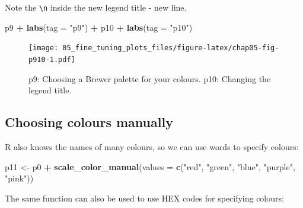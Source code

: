 \documentclass[
  12pt,
  krantz2]{krantz}
\makeatletter
\newenvironment{Shaded}{\begin{snugshade}}{\end{snugshade}}
\newcommand{\DataTypeTok}[1]{\textcolor[rgb]{0.13,0.29,0.53}{#1}}
\newcommand{\KeywordTok}[1]{\textcolor[rgb]{0.13,0.29,0.53}{\textbf{#1}}}
\newcommand{\NormalTok}[1]{#1}
\newcommand{\OperatorTok}[1]{\textcolor[rgb]{0.81,0.36,0.00}{\textbf{#1}}}
\newcommand{\StringTok}[1]{\textcolor[rgb]{0.31,0.60,0.02}{#1}}
\newenvironment{kframe}{%
\medskip{}
\setlength{\fboxsep}{.8em}
 \def\at@end@of@kframe{}%
 \ifinner\ifhmode%
  \def\at@end@of@kframe{\end{minipage}}%
  \begin{minipage}{\columnwidth}%
 \fi\fi%
 \def\FrameCommand##1{\hskip\@totalleftmargin \hskip-\fboxsep
 \colorbox{shadecolor}{##1}\hskip-\fboxsep
     \hskip-\linewidth \hskip-\@totalleftmargin \hskip\columnwidth}%
 \MakeFramed {\advance\hsize-\width
   \@totalleftmargin\z@ \linewidth\hsize
   \@setminipage}}%
 {\par\unskip\endMakeFramed%
 \at@end@of@kframe}
\renewenvironment{Shaded}{\begin{kframe}}{\end{kframe}}
\makeatother
\begin{document}
Note the \texttt{\textbackslash{}n} inside the new legend title - new line.

\begin{Shaded}
\begin{Highlighting}[]
\NormalTok{p9 }\OperatorTok{+}\StringTok{ }\KeywordTok{labs}\NormalTok{(}\DataTypeTok{tag =} \StringTok{"p9"}\NormalTok{) }\OperatorTok{+}\StringTok{ }\NormalTok{p10 }\OperatorTok{+}\StringTok{ }\KeywordTok{labs}\NormalTok{(}\DataTypeTok{tag =} \StringTok{"p10"}\NormalTok{)}
\end{Highlighting}
\end{Shaded}

\begin{figure}
\centering
\texttt{[image: 05\_fine\_tuning\_plots\_files/figure-latex/chap05-fig-p910-1.pdf]}
\caption{\label{fig:chap05-fig-p910}p9: Choosing a Brewer palette for your colours. p10: Changing the legend title.}
\end{figure}

\hypertarget{choosing-colours-manually}{%
\subsection{Choosing colours manually}\label{choosing-colours-manually}}

R also knows the names of many colours, so we can use words to specify colours:

\begin{Shaded}
\begin{Highlighting}[]
\NormalTok{p11 <-}\StringTok{ }\NormalTok{p0 }\OperatorTok{+}
\StringTok{  }\KeywordTok{scale_color_manual}\NormalTok{(}\DataTypeTok{values =} \KeywordTok{c}\NormalTok{(}\StringTok{"red"}\NormalTok{, }\StringTok{"green"}\NormalTok{, }\StringTok{"blue"}\NormalTok{, }\StringTok{"purple"}\NormalTok{, }\StringTok{"pink"}\NormalTok{))}
\end{Highlighting}
\end{Shaded}

The same function can also be used to use HEX codes for specifying colours:

\begin{Shaded}
\end{Shaded}
\end{document}
